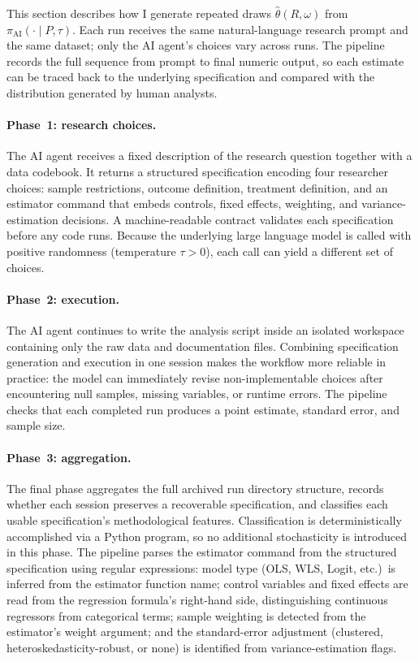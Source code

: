 \documentclass[12pt]{article}
\begin{document}
This section describes how I generate repeated draws $\hat\theta(R,\omega)$ from $\pi_{\mathrm{AI}}(\cdot\mid P,\tau)$. Each run receives the same natural-language research prompt and the same dataset; only the AI agent's choices vary across runs. The pipeline records the full sequence from prompt to final numeric output, so each estimate can be traced back to the underlying specification and compared with the distribution generated by human analysts.

\paragraph{Phase~1: research choices.}
\label{sec:phase1}
The AI agent receives a fixed description of the research question together with a data codebook. It returns a structured specification encoding four researcher choices: sample restrictions, outcome definition, treatment definition, and an estimator command that embeds controls, fixed effects, weighting, and variance-estimation decisions. A machine-readable contract validates each specification before any code runs. Because the underlying large language model is called with positive randomness (temperature $\tau>0$), each call can yield a different set of choices.

\paragraph{Phase~2: execution.}
\label{sec:phase2}
The AI agent continues to write the analysis script inside an isolated workspace containing only the raw data and documentation files. Combining specification generation and execution in one session makes the workflow more reliable in practice: the model can immediately revise non-implementable choices after encountering null samples, missing variables, or runtime errors. The pipeline checks that each completed run produces a point estimate, standard error, and sample size.

\paragraph{Phase~3: aggregation.}
\label{sec:phase3}
The final phase aggregates the full archived run directory structure, records whether each session preserves a recoverable specification, and classifies each usable specification's methodological features. Classification is deterministically accomplished via a Python program, so no additional stochasticity is introduced in this phase. The pipeline parses the estimator command from the structured specification using regular expressions: model type (OLS, WLS, Logit, etc.)\ is inferred from the estimator function name; control variables and fixed effects are read from the regression formula's right-hand side, distinguishing continuous regressors from categorical terms; sample weighting is detected from the estimator's weight argument; and the standard-error adjustment (clustered, heteroskedasticity-robust, or none) is identified from variance-estimation flags.
\end{document}
